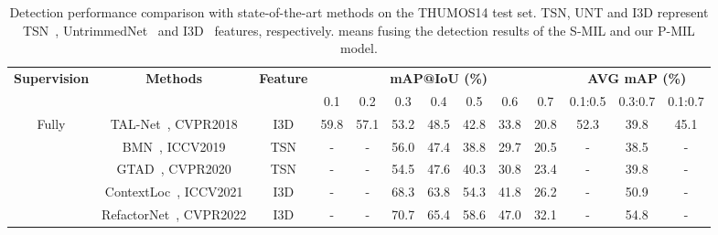 \begin{table*}[t]
    \vspace{-1em}
	\footnotesize
	\centering
	\caption{Detection performance comparison with state-of-the-art methods on the THUMOS14 test set.
TSN, UNT and I3D represent TSN~\cite{eccv2016tsn}, UntrimmedNet~\cite{cvpr2017untrimmednets} and I3D~\cite{cvpr2017i3d} features, respectively.
		 means fusing the detection results of the S-MIL and our P-MIL model.
	}
    \vspace{-0.5em}
	\label{tab:thumos14}
	\begin{tabular}{c|c|c|ccccccc|ccc}
    \toprule
    \multirow{2.5}{*}{\bf Supervision} & \multirow{2.5}{*}{\bf Methods}   & \multirow{2.5}{*}{\bf Feature} & \multicolumn{7}{c}{\bf mAP@IoU (\%)}               & \multicolumn{3}{c}{\bf AVG mAP (\%)} \\
                                                                                               \cmidrule{4-13}
                                   &                              &                            & 0.1  & 0.2  & 0.3  & 0.4  & 0.5  & 0.6  & 0.7  & 0.1:0.5 & 0.3:0.7 & 0.1:0.7 \\
    \midrule
    \multirow{5}{*}{Fully}         
& TAL-Net~\cite{cvpr2018tal-net}, CVPR2018          & I3D                      & 59.8          & 57.1          & 53.2          & 48.5          & 42.8          & 33.8          & 20.8          & 52.3          & 39.8          & 45.1          \\
                                   & BMN~\cite{iccv2019bmn}, ICCV2019                  & TSN                      & -             & -             & 56.0          & 47.4          & 38.8          & 29.7          & 20.5          & -             & 38.5          & -             \\
& GTAD~\cite{cvpr2020gtad}, CVPR2020                & TSN                      & -             & -             & 54.5          & 47.6          & 40.3          & 30.8          & 23.4          & -             & 39.8          & -             \\
                                   & ContextLoc~\cite{iccv2021contextloc}, ICCV2021    & I3D                      & -             & -             & 68.3          & 63.8          & 54.3          & 41.8          & 26.2          & -             & 50.9          & -             \\
                                   & RefactorNet~\cite{cvpr2022RefactorNet}, CVPR2022  & I3D                      & -             & -             & 70.7          & 65.4          & 58.6          & 47.0          & 32.1          & -             & 54.8          & -             \\

\end{tabular}
\end{table*}
